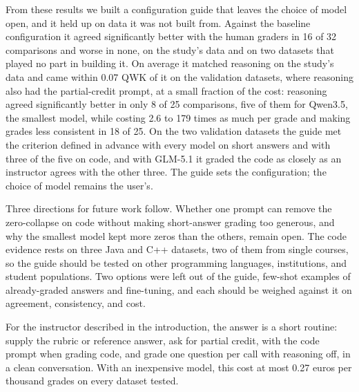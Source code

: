 From these results we built a configuration guide that leaves the choice of model open, and it held up on data it was not
built from.
Against the baseline configuration it agreed significantly better with
the human graders in 16 of 32 comparisons and worse in none, on the study's data and on two datasets that played no
part in building it. On average it matched reasoning on the study's data and came within 0.07 QWK of it on the
validation datasets, where reasoning also had the partial-credit prompt, at a small fraction of the cost: reasoning agreed
significantly better in only 8 of 25 comparisons, five of them for Qwen3.5, the smallest model, while costing 2.6
to 179 times as much per grade and making grades less consistent in 18 of 25. On the two validation datasets the guide
met the criterion defined in advance with every model on short answers and with three of the five on code, and with
GLM-5.1 it graded the code as closely as an instructor agrees with the other three. The guide sets the
configuration; the choice of model remains the user's.

Three directions for future work follow. Whether one prompt can remove the zero-collapse on code without making
short-answer grading too generous, and why the smallest model kept more zeros than the others, remain open. The code
evidence rests on three Java and C++ datasets, two of them from single courses, so the guide should be tested on
other programming languages, institutions, and student populations. Two options were left out of the guide,
few-shot examples of already-graded answers and fine-tuning, and each should be weighed against it on agreement,
consistency, and cost.

For the instructor described in the introduction, the answer is a short routine: supply the rubric or reference
answer, ask for partial credit, with the code prompt when grading code, and grade one question per call with
reasoning off, in a clean conversation. With an inexpensive model, this cost at most 0.27 euros per thousand
grades on every dataset tested.
